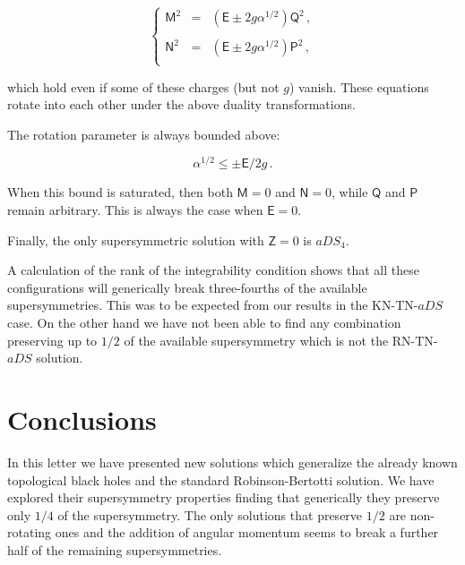 \documentclass[12pt,a4paper]{article}
\begin{document}
\begin{equation}
\left\{
\begin{array}{rcl}
\mathsf{M}^{2} & = & (\mathsf{E}\pm 2g\alpha^{1/2})\mathsf{Q}^{2}\, ,\\
& & \\
\mathsf{N}^{2} & = & (\mathsf{E}\pm 2g\alpha^{1/2})\mathsf{P}^{2}\, ,\\
\end{array}
\right.
\end{equation}

\noindent which hold even if some of these charges (but not $g$) vanish. 
These equations rotate into each other under the above duality
transformations.

The rotation parameter is always bounded above:

\begin{equation}
\alpha^{1/2}\leq  \pm\mathsf{E}/2g\, .  
\end{equation}

When this bound is saturated, then both $\mathsf{M}=0$ and
$\mathsf{N}=0$, while $\mathsf{Q}$ and $\mathsf{P}$ remain arbitrary.
This is always the case when $\mathsf{E}=0$.

Finally, the only supersymmetric solution with $\mathsf{Z}=0$ is
$aDS_{4}$.

A calculation of the rank of the integrability condition shows that 
all these configurations will generically break three-fourths of the 
available supersymmetries. This was to be expected from our results
in the KN-TN-$aDS$ case. On the other hand we have not been able to 
find any combination preserving up to $1/2$ of the available
supersymmetry which is not the RN-TN-$aDS$ solution.


\section{Conclusions}
\label{sec-conclusions}


In this letter we have presented new solutions which generalize the
already known topological black holes and the standard
Robinson-Bertotti solution. We have explored their supersymmetry
properties finding that generically they preserve only $1/4$ of the
supersymmetry. The only solutions that preserve $1/2$ are non-rotating
ones and the addition of angular momentum seems to break a further half
of the remaining supersymmetries.
\end{document}
